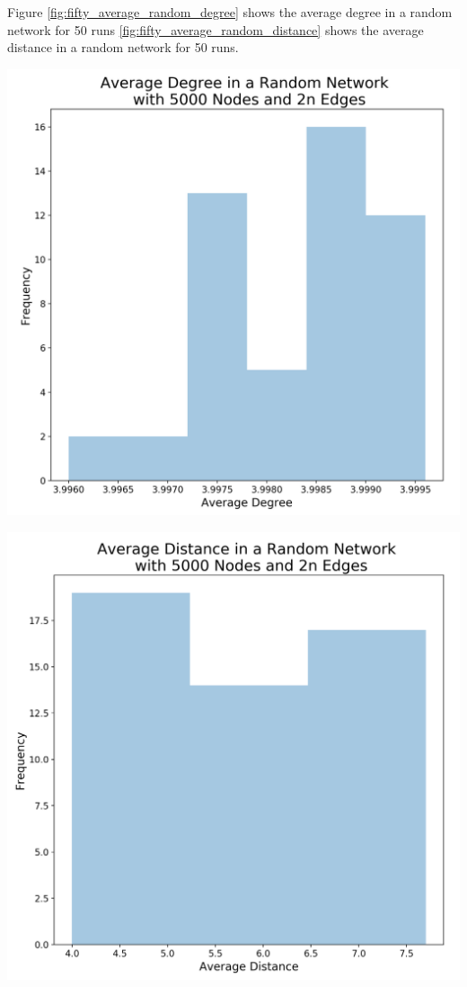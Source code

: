 \documentclass[journal]{IEEEtran}
\begin{document}
\newpage

\noindent Figure \ref{fig:fifty_average_random_degree} shows the average degree in a random network for 50 runs \ref{fig:fifty_average_random_distance} shows the average distance in a random network for 50 runs.


\begingroup
    \centering
    \medskip
    \includegraphics[width=\columnwidth]{images/r_deg_50.png}
    \label{fig:fifty_average_random_degree}
    \medskip
\endgroup

\bigskip
\bigskip
\bigskip

\begingroup
    \centering
    \medskip
    \includegraphics[width=\columnwidth]{images/r_dist_50.png}
    \label{fig:fifty_average_random_distance}
    \medskip
\endgroup
\end{document}
